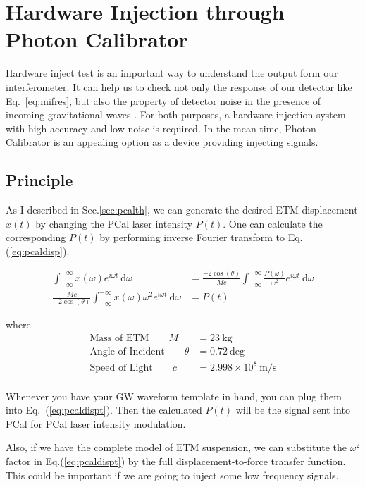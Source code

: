 
\chapter{Hardware Injection through Photon Calibrator}

Hardware inject test is an important way to understand the output form our interferometer. It can help us to check not only the response of our detector like Eq.~\ref{eq:mifres}, but also the property of detector noise in the presence of incoming gravitational waves \cite{ligo:inj}. For both purposes, a hardware injection system with high accuracy and low noise is required. In the mean time, Photon Calibrator is an appealing option as a device providing injecting signals. 

\section{Principle}
 As I described in Sec.\ref{sec:pcalth}, we can generate the desired ETM displacement $x(t)$ by changing the PCal laser intensity $P(t)$. One can calculate the corresponding $P(t)$ by performing inverse Fourier transform to Eq.(\ref{eq:pcaldisp}).
 
\begin{align}
    \int_{-\infty}^{-\infty} x(\omega) e^{i \omega t} ~\mathrm{d} \omega &= 
     \frac{-2   \cos(\theta)}{Mc} 
     \int_{-\infty}^{-\infty}\frac{P(\omega)}{\omega^2} e^{i \omega t} ~\mathrm{d} \omega \\
\label{eq:pcaldispt}
    \frac{Mc}{-2 \cos(\theta)} \int_{-\infty}^{-\infty}
     x(\omega) \omega^2 e^{i \omega t} ~\mathrm{d} \omega 
&= P(t) 
\end{align}

where
\begin{align*}
   \text{Mass of ETM} \qquad  M &= 23 ~\mathrm{kg} \\
   \text{Angle of Incident} \qquad   \theta &= 0.72 ~\mathrm{deg}  \\
   \text{Speed of Light} \qquad   c &= 2.998\times10^8 ~\mathrm{m/s} \\
\end{align*}

Whenever you have your GW waveform template in hand, you can plug them into Eq.~(\ref{eq:pcaldispt}). Then the calculated $P(t)$ will be the signal sent into PCal for PCal laser intensity modulation.

Also, if we have the complete model of ETM suspension, we can substitute the $\omega^2$ factor in Eq.(\ref{eq:pcaldispt}) by the full displacement-to-force transfer function. This could be important if we are going to inject some low frequency signals.


